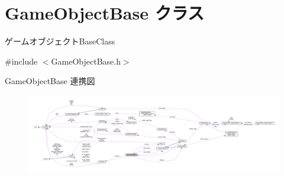 \hypertarget{class_game_object_base}{}\section{Game\+Object\+Base クラス}
\label{class_game_object_base}


ゲームオブジェクト\+Base\+Class  




{\ttfamily \#include $<$Game\+Object\+Base.\+h$>$}



Game\+Object\+Base 連携図\nopagebreak
\begin{figure}[H]
\begin{center}
\leavevmode
\includegraphics[width=350pt]{class_game_object_base__coll__graph}
\end{center}
\end{figure}
